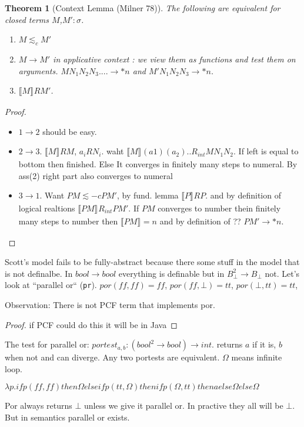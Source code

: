 \documentclass[a4paper,10pt]{book}
\newtheorem{theorem}{Theorem}
\newcommand{\sem}[2]{ \llbracket#1\rrbracket_{#2} }
\newcommand{\rarr}{ \rightarrow }
\renewcommand{\tt}{ tt }
\newcommand{\ff}{ ff }
\begin{document}
\begin{theorem}[Context Lemma (Milner 78)]
 The following are equivalent for closed terms $M$,$M':\sigma$.
 \begin{enumerate}
  \item $M\lesssim_c M'$
  \item $M \rarr M'$ in applicative context : we view them as functions and test them on arguments.
  $MN_1N_2N_3 .... \rarr * n$ and $M'N_1N_2N_3 \rarr * n$.
  \item $\sem{M}{}RM'$.
 \end{enumerate}
\end{theorem}
\begin{proof}
 \begin{itemize}
  \item $1\rarr 2$ should be easy.
  \item $2\rarr 3$. $\sem{M}{}RM$, $a_iRN_i$. waht $\sem{M}{}(a1)(a_2).. R_{int}MN_1N_2$. If left
  is equal to bottom then finished. Else It converges in finitely many steps to numeral. By ass(2)
  right part also converges to numeral
  \item $3\rarr 1$. Want $PM \lesssim-c PM'$, by fund. lemma $\sem{P}{}RP$. and by definition of logical
  realtions  $\sem{PM}{}R_{int}PM'$. If $PM$ converges to number thein finitely many steps to number
  then $\sem{PM}{}=n$ and by definition of ?? $PM' \rarr * n$.
 \end{itemize}

\end{proof}

Scott's model fails to be fully-abstract because there some stuff in the model that is not definalbe.
In $bool\rarr bool$ everything is definable but in $B_\bot^2\rarr B_\bot$ not.
Let's look at ``parallel or`` (\verb=pr=).
$por(\ff,\ff) = \ff$,
$por(\ff,\bot) = \tt$,
$por(\bot,\tt) = \tt$,

Observation: There is not PCF term that implements por.
\begin{proof}
 if PCF could do this it will be in Java
\end{proof}

The test for parallel or: $portest_{a,b} : (bool^2\rarr bool)\rarr int$. returns $a$ if it is, $b$
when not and can diverge. Any two portests are equivalent. $\Omega$ means infinite loop.

$\lambda p . if p(\ff,\ff) then \Omega else if p(\tt,\Omega) 
    then if p(\Omega,\tt) then a else \Omega
    else \Omega$
    
Por always returns $\bot$    unless we give it parallel or. In practive they all  will be $\bot$.
But in semantics parallel or exists.
\end{document}
